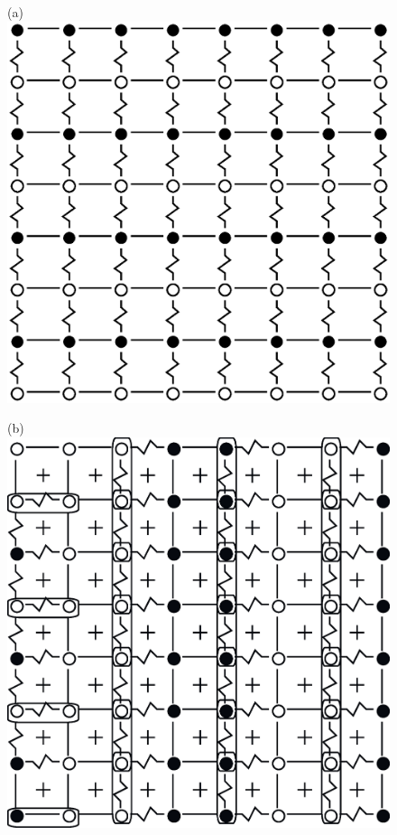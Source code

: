 \documentclass[utf8, babel, sor, jor, amsmath, amssymb, reprint]{elsarticle} %
\begin{document}
\begin{figure}[H]
	\begin{minipage}[h]{0.3\linewidth}
		\centering(a)
		\includegraphics[width=1\linewidth]{pictures/SI_64_J0_1}
	\end{minipage}
	\hfill
	\begin{minipage}[h]{0.3\linewidth}
		\centering(b)
		\includegraphics[width=1\linewidth]{pictures/SI_64_J0}

\end{minipage}
\end{figure}
\end{document}
